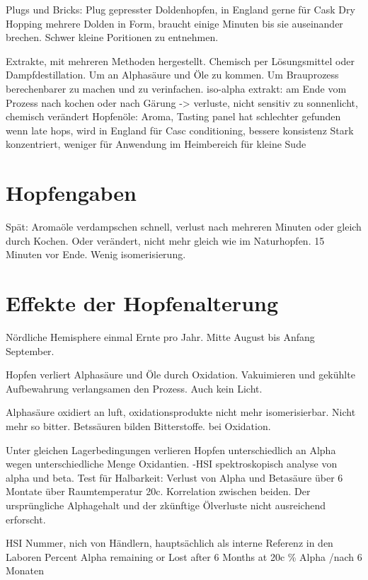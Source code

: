 \documentclass[a4paper,parskip=half]{scrartcl}
\begin{document}
\parencite[84\psq]{Garetz1994}
Plugs und Bricks: 
Plug gepresster Doldenhopfen, in England gerne für Cask Dry Hopping
mehrere Dolden in Form, braucht einige Minuten bis sie auseinander
brechen. Schwer kleine Poritionen zu entnehmen.

\parencite[88-93]{Garetz1994}
Extrakte, mit mehreren Methoden hergestellt. Chemisch per Lösungsmittel
oder Dampfdestillation. Um an Alphasäure und Öle zu kommen.
Um Brauprozess berechenbarer zu machen und zu verinfachen.
iso-alpha extrakt: am Ende vom Prozess nach kochen oder
nach Gärung -> verluste, nicht sensitiv zu sonnenlicht, chemisch verändert
Hopfenöle: Aroma, Tasting panel hat schlechter gefunden wenn
late hops, wird in England für Casc conditioning, bessere konsistenz
Stark konzentriert, weniger für Anwendung im Heimbereich für
kleine Sude

\section*{Hopfengaben}

\parencite[15]{Garetz1994}
Spät: Aromaöle verdampschen schnell, verlust nach mehreren Minuten
oder gleich durch Kochen. Oder verändert, nicht mehr gleich
wie im Naturhopfen. 15 Minuten vor Ende. Wenig isomerisierung.

\section*{Effekte der Hopfenalterung}

Nördliche Hemisphere einmal Ernte pro Jahr. Mitte August bis
Anfang September.
\parencite[97]{Garetz1994}

\parencite[97]{Garetz1994} Hopfen verliert Alphasäure und Öle
durch Oxidation. Vakuimieren und gekühlte Aufbewahrung verlangsamen
den Prozess. Auch kein Licht. 

\parencite[103]{Garetz1994} Alphasäure oxidiert an luft, oxidationsprodukte
nicht mehr isomerisierbar. Nicht mehr so bitter. Betssäuren bilden
Bitterstoffe. bei Oxidation.

\parencite[104]{Garetz1994} 
Unter gleichen Lagerbedingungen verlieren Hopfen unterschiedlich an
Alpha wegen unterschiedliche Menge Oxidantien.
-HSI spektroskopisch analyse von alpha und beta. Test für Halbarkeit:
Verlust von Alpha und Betasäure über 6 Montate über Raumtemperatur 20c.
Korrelation zwischen beiden. Der ursprüngliche Alphagehalt und der
zkünftige
Ölverluste nicht ausreichend erforscht.

\parencite[104]{Garetz1994} 
HSI Nummer, nich von Händlern, hauptsächlich als interne Referenz
in den Laboren
Percent Alpha remaining or Lost after 6 Months at 20c
\% Alpha /nach 6 Monaten
\end{document}
